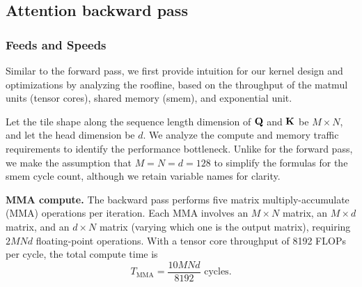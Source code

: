 \subsection{Attention backward pass}
\label{sec:bwd}



\subsubsection{Feeds and Speeds}

Similar to the forward pass, we first provide intuition for our kernel design and optimizations by analyzing the roofline, based on the throughput of the matmul units (tensor cores), shared memory (smem), and exponential unit.

Let the tile shape along the sequence length dimension of $\mathbf{Q}$ and $\mathbf{K}$ be $M \times N$, and let the head dimension be $d$. We analyze the compute and memory traffic requirements to identify the performance bottleneck. Unlike for the forward pass, we make the assumption that $M = N = d = 128$ to simplify the formulas for the smem cycle count, although we retain variable names for clarity.

\noindent\textbf{MMA compute.}
The backward pass performs five matrix multiply-accumulate (MMA) operations per iteration. Each MMA involves an $M \times N$ matrix, an $M \times d$ matrix, and an $d \times N$  matrix (varying which one is the output matrix), requiring $2MNd$ floating-point operations. With a tensor core throughput of 8192 FLOPs per cycle, the total compute time is
{\setlength{\abovedisplayskip}{2pt}%
 \setlength{\belowdisplayskip}{2pt}%
 \setlength{\abovedisplayshortskip}{2pt}%
 \setlength{\belowdisplayshortskip}{2pt}%
\begin{equation}
    T_{\text{MMA}} = \frac{10MNd}{8192} \text{ cycles}.
\end{equation}}

